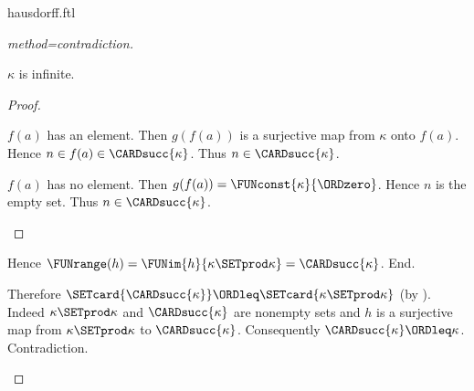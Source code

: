 \documentclass{article}
\begin{document}
\begin{smodule}{hausdorff.ftl}
\begin{forthel}
\begin{proof}[method=contradiction]
\begin{case}{$\kappa$ is infinite.}
\begin{proof}
          \begin{case}{$f(a)$ has an element.}
            Then $g(f(a))$ is a surjective map from $\kappa$ onto $f(a)$.
            Hence $n \in f(a) \in \CARDsucc{\kappa}$.
            Thus $n \in \CARDsucc{\kappa}$.
          \end{case}
  
          \begin{case}{$f(a)$ has no element.}
            Then $g(f(a)) = \FUNconst{\kappa}{\ORDzero}$.
            Hence $n$ is the empty set.
            Thus $n \in \CARDsucc{\kappa}$.
          \end{case}
        \end{proof}
  
        Hence $\FUNrange(h) = \FUNim{h}{\kappa \SETprod \kappa} = \CARDsucc{\kappa}$.
      End.
  
      Therefore $\SETcard{\CARDsucc{\kappa}} \ORDleq \SETcard{\kappa \SETprod \kappa}$ (by ).
      Indeed $\kappa \SETprod \kappa$ and $\CARDsucc{\kappa}$ are nonempty sets and $h$ is a surjective map from $\kappa \SETprod \kappa$ to $\CARDsucc{\kappa}$.
      Consequently $\CARDsucc{\kappa} \ORDleq \kappa$.
      Contradiction.
    \end{case}
  \end{proof}
\end{forthel}

\printbibliography
\end{smodule}
\end{document}
